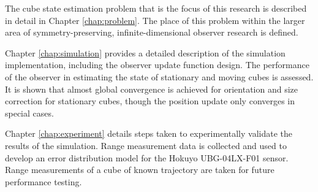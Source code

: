 The cube state estimation problem that is the focus of this research is described in detail in Chapter \ref{chap:problem}. The place of this problem within the larger area of symmetry-preserving, infinite-dimensional observer research is defined.  

Chapter \ref{chap:simulation} provides a detailed description of the simulation implementation, including the observer update function design. The performance of the observer in estimating the state of stationary and moving cubes is assessed. It is shown that almost global convergence is achieved for orientation and size correction for stationary cubes, though the position update only converges in special cases.

Chapter \ref{chap:experiment} details steps taken to experimentally validate the results of the simulation. Range measurement data is collected and used to develop an error distribution model for the Hokuyo UBG-04LX-F01 sensor. Range measurements of a cube of known trajectory are taken for future performance testing.


